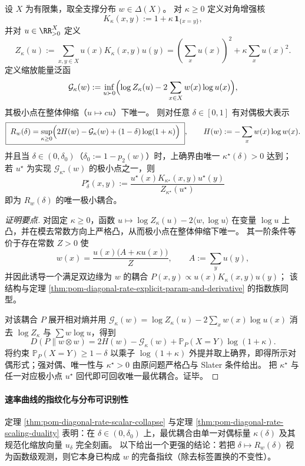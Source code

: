 \begin{theorem}\label{thm:pom-diagonal-rate-scaling-duality}
设 \(X\) 为有限集，取全支撑分布 \(w\in\Delta(X)\)。
对 \(\kappa\ge 0\) 定义对角增强核
\[
K_\kappa(x,y):=1+\kappa\,\mathbf 1_{\{x=y\}},
\]
并对 \(u\in\RR_{>0}^{X}\) 定义
\[
Z_\kappa(u):=\sum_{x,y\in X}u(x)K_\kappa(x,y)u(y)
=(\sum_x u(x))^2+\kappa\sum_x u(x)^2.
\]
定义缩放能量泛函
\[
\mathcal G_\kappa(w):=\inf_{u\succ 0}\Bigl(\log Z_\kappa(u)-2\sum_{x\in X}w(x)\log u(x)\Bigr),
\]
其极小点在整体伸缩（\(u\mapsto cu\)）下唯一。
则对任意 \(\delta\in[0,1]\) 有对偶极大表示
\[
\boxed{\;
R_w(\delta)=\sup_{\kappa\ge 0}\Bigl(2H(w)-\mathcal G_\kappa(w)+(1-\delta)\log(1+\kappa)\Bigr)\;},
\qquad
H(w):=-\sum_x w(x)\log w(x).
\]
并且当 \(\delta\in(0,\delta_0)\)（\(\delta_0:=1-p_2(w)\)）时，上确界由唯一 \(\kappa^\star(\delta)>0\) 达到；
若 \(u^\star\) 为实现 \(\mathcal G_{\kappa^\star}(w)\) 的极小点之一，则
\[
\boxed{\;
P^\star_\delta(x,y):=\frac{u^\star(x)K_{\kappa^\star}(x,y)u^\star(y)}{Z_{\kappa^\star}(u^\star)}\;}
\]
即为 \(R_w(\delta)\) 的唯一极小耦合。
\end{theorem}
\begin{proof}[证明要点]
对固定 \(\kappa\ge 0\)，函数
\(
u\mapsto \log Z_\kappa(u)-2\langle w,\log u\rangle
\)
在变量 \(\log u\) 上凸，并在模去常数方向上严格凸，从而极小点在整体伸缩下唯一。
其一阶条件等价于存在常数 \(Z>0\) 使
\[
w(x)=\frac{u(x)\bigl(A+\kappa u(x)\bigr)}{Z},
\qquad A:=\sum_y u(y),
\]
并因此诱导一个满足双边缘为 \(w\) 的耦合
\(
P(x,y)\propto u(x)K_\kappa(x,y)u(y)
\)；
该结构与定理 \ref{thm:pom-diagonal-rate-explicit-param-and-derivative} 的指数族同型。
\par
对该耦合 \(P\) 展开相对熵并用
\(
\mathcal G_\kappa(w)=\log Z_\kappa(u)-2\sum_x w(x)\log u(x)
\)
消去 \(\log Z_\kappa\) 与 \(\sum w\log u\)，得到
\[
D(P\|w\otimes w)=2H(w)-\mathcal G_\kappa(w)+\mathbb P_P(X=Y)\log(1+\kappa).
\]
将约束 \(\mathbb P_P(X=Y)\ge 1-\delta\) 以乘子 \(\log(1+\kappa)\) 外提并取上确界，即得所示对偶形式；强对偶、唯一性与 \(\kappa^\star>0\) 由原问题严格凸与 Slater 条件给出。
把 \(\kappa^\star\) 与任一对应极小点 \(u^\star\) 回代即可回收唯一最优耦合。证毕。
\end{proof}

\paragraph{速率曲线的指纹化与分布可识别性}
定理 \ref{thm:pom-diagonal-rate-scalar-collapse} 与定理 \ref{thm:pom-diagonal-rate-scaling-duality} 表明：在 \(\delta\in(0,\delta_0)\) 上，最优耦合由单一对偶标量 \(\kappa(\delta)\) 及其规范化缩放向量 \(u_\delta\) 完全刻画。
以下给出一个更强的结论：若把 \(\delta\mapsto R_w(\delta)\) 视为函数级观测，则它本身已构成 \(w\) 的完备指纹（除去标签置换的不变性）。

